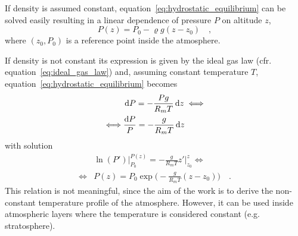 \documentclass[a4paper,10pt,twocolumn,\classoptions]{article}
\begin{document}
If density is assumed constant, equation~\eqref{eq:hydrostatic_equilibrium} can be solved easily resulting in a linear dependence of pressure $P$ on altitude $z$, %
\begin{equation}
  \label{eq:pressure_constant_density}
  P(z) = P_0 - \varrho g (z - z_0)
  \quad ,
\end{equation}
where $(z_0, P_0)$ is a reference point inside the atmosphere.

If density is not constant its expression is given by the ideal gas law (cfr. equation~\eqref{eq:ideal_gas_law}) and, assuming constant temperature $T$, equation~\eqref{eq:hydrostatic_equilibrium} becomes
\begin{equation}
  \label{eq:hydrostatic_equilibrium_ideal_gas_law_constant_temperature}
  \begin{split}
    & \odif{P} = - \frac{P g}{R_m T} \odif{z} \iff \\
    \iff & \frac{\odif{P}}{P} = - \frac{g}{R_m T} \odif{z}
  \end{split}
\end{equation}
with solution
\begin{equation}
  \label{eq:pressure_constant_temperature}
  \begin{split}
    & \ln(P') \bigg|_{P_0}^{P(z)} = - \frac{g}{R_m T} z' \bigg|_{z_0}^{z} \iff \\
    \iff & P(z) = P_0 \exp{\bigg( - \frac{g}{R_m T} (z - z_0) \bigg)}
    \quad .
  \end{split}
\end{equation}
This relation is not meaningful, since the aim of the work is to derive the non-constant temperature profile of the atmosphere. However, it can be used inside atmospheric layers where the temperature is considered constant (e.g. stratosphere).
\end{document}
